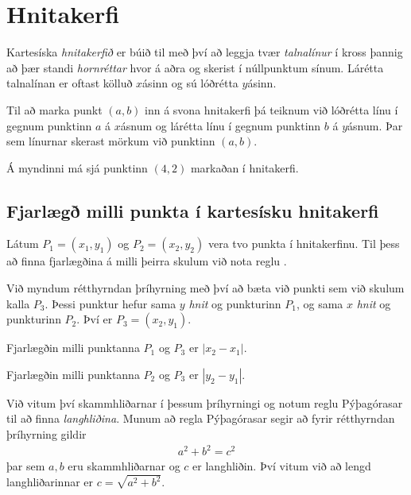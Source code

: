 \documentclass[a4paper,10pt,icelandic]{sphinxmanual}
\begin{document}
\section{Hnitakerfi}
\label{\detokenize{Kafli03:hnitakerfi}}
Kartesíska \textit{hnitakerfið} er búið til með því að leggja tvær \textit{talnalínur} í kross þannig að þær standi \textit{hornréttar} hvor á aðra og skerist í núllpunktum sínum.
Lárétta talnalínan er oftast kölluð \(x\)\sphinxhyphen{}ásinn og sú lóðrétta \(y\)\sphinxhyphen{}ásinn.

Til að marka punkt \((a,b)\) inn á svona hnitakerfi þá teiknum við lóðrétta línu í gegnum punktinn \(a\) á \(x\)\sphinxhyphen{}ásnum og lárétta línu í gegnum punktinn \(b\) á \(y\)\sphinxhyphen{}ásnum.
Þar sem línurnar skerast mörkum við punktinn \((a,b)\).

Á myndinni má sjá punktinn \((4,2)\) markaðan í hnitakerfi.



\subsection{Fjarlægð milli punkta í kartesísku hnitakerfi}
\label{\detokenize{Kafli03:fjarlaeg-milli-punkta-i-kartesisku-hnitakerfi}}
Látum \(P_1=(x_1,y_1)\) og \(P_2=(x_2,y_2)\) vera tvo punkta í hnitakerfinu. Til þess að finna fjarlægðina á milli þeirra skulum við nota reglu .

Við myndum rétthyrndan þríhyrning með því að bæta við punkti sem við skulum kalla \(P_3\). Þessi punktur hefur sama \(y\)\sphinxhyphen{} \textit{hnit} og punkturinn \(P_1\), og sama \(x\)\sphinxhyphen{} \textit{hnit} og punkturinn \(P_2\). Því er \(P_3=(x_2, y_1)\).


Fjarlægðin milli punktanna \(P_1\) og \(P_3\) er \(|x_2-x_1|\).

Fjarlægðin milli punktanna \(P_2\) og \(P_3\) er \(|y_2-y_1|\).

Við vitum því skammhliðarnar í þessum þríhyrningi og notum reglu Pýþagórasar til að finna \textit{langhliðina}. Munum að regla Pýþagórasar segir að fyrir rétthyrndan þríhyrning gildir
\begin{equation*}
\begin{split}a^2+b^2=c^2\end{split}
\end{equation*}
þar sem \(a, b\) eru skammhliðarnar og \(c\) er langhliðin. Því vitum við að lengd langhliðarinnar er \(c=\sqrt{a^2+b^2}\).
\end{document}
